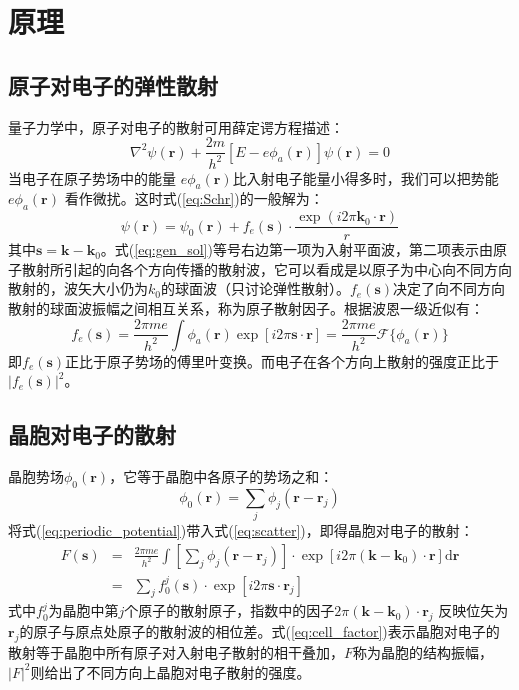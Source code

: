 \documentclass[aps,pre,12pt,preprint,onecolumn,showpacs,showkeys]{revtex4-1}
\def \d {\mathrm d}
\begin{document}
\section{原理}
    \subsection{原子对电子的弹性散射}
        量子力学中，原子对电子的散射可用薛定谔方程描述：
        \begin{equation}\label{eq:Schr}
            \nabla ^2 \psi (\bm r) + \frac{2 m}{h^2}[E-e \phi _a (\bm r)]\psi (\bm r)=0
        \end{equation}
        当电子在原子势场中的能量 $ e \phi _a(\bm r)$比入射电子能量小得多时，我们可以把势能$ e \phi _a(\bm r)$ 看作微扰。这时式(\ref{eq:Schr})的一般解为：
        \begin{equation}\label{eq:gen_sol}
            \psi(\bm r)=\psi _0 (\bm r)+f _e (\bm s)\cdot \frac{\exp(i 2 \pi \bm{k}_0 \cdot \bm r)}{r}
        \end{equation}
        其中$\bm s = \bm k - \bm k_0$。式(\ref{eq:gen_sol})等号右边第一项为入射平面波，第二项表示由原子散射所引起的向各个方向传播的散射波，它可以看成是以原子为中心向不同方向散射的，波矢大小仍为$k_0$的球面波（只讨论弹性散射）。$f_e(\bm s)$决定了向不同方向散射的球面波振幅之间相互关系，称为原子散射因子。根据波恩一级近似有：
        \begin{equation}\label{eq:scatter}
            f_e(\bm s)=\frac{2 \pi m e}{h^2}\int \phi _a (\bm r)\exp[i 2 \pi \bm{s}\cdot \bm {r}]=\frac{2 \pi m e }{h^2}\mathcal{F}\{\phi _a (\bm r)\}
        \end{equation}
        即$f_e(\bm s)$正比于原子势场的傅里叶变换。而电子在各个方向上散射的强度正比于$|f_e(\bm s)|^2$。
    \subsection{晶胞对电子的散射}
        晶胞势场$\phi_0(\bm r)$，它等于晶胞中各原子的势场之和：
        \begin{equation}\label{eq:periodic_potential}
            \phi _0 (\bm r)=\sum_j \phi _j (\bm{r}-\bm{r}_j)
        \end{equation}
        将式(\ref{eq:periodic_potential})带入式(\ref{eq:scatter})，即得晶胞对电子的散射：
        \begin{eqnarray}\label{eq:cell_factor}
            F(\bm s)&=& \frac{2 \pi m e }{h^2}\int\left[\sum _j \phi _j (\bm r- \bm r _j)\right]\cdot \exp[i 2 \pi (\bm k - \bm k_0)\cdot \bm r]\d \bm r \nonumber \\
            &=&\sum_j f_0^j (\bm s) \cdot \exp[i 2\pi \bm s \cdot \bm r _j]
        \end{eqnarray}
        式中$f_0^j$为晶胞中第$j$个原子的散射原子，指数中的因子$2\pi (\bm k -\bm k_0)\cdot \bm r_j$ 反映位矢为$\bm r_j$的原子与原点处原子的散射波的相位差。式(\ref{eq:cell_factor})表示晶胞对电子的散射等于晶胞中所有原子对入射电子散射的相干叠加，$F$称为晶胞的结构振幅，$|F|^2$则给出了不同方向上晶胞对电子散射的强度。
\end{document}
